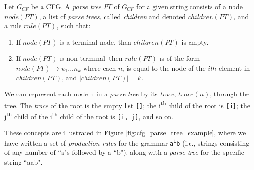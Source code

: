 \begin{definition}
\label{def:parse_tree}
Let $G_{CF}$ be a CFG. A \textit{parse tree} $PT$ of $G_{CF}$ for a given string consists of a node $node(PT)$, a list of \textit{parse trees}, called \textit{children} and denoted $children(PT)$, and a rule $rule(PT)$, such that:
\begin{enumerate}[nolistsep]
\item If $node(PT)$ is a terminal node, then $children(PT)$ is empty.
\item If $node(PT)$ is non-terminal, then $rule(PT)$ is of the form $node(PT) \to n_1 ... n_k$ where each $n_i$ is equal to the node of the $ith$ element in $children(PT)$, and $|children(PT)| = k$.
\end{enumerate}
\end{definition}

\begin{definition}
We can represent each node n in a \textit{parse tree} by its \textit{trace}, $trace(n)$, through the tree. The \textit{trace} of the root is the empty list \texttt{[]}; the i\textsuperscript{th} child of the root is \texttt{[i]}; the j\textsuperscript{th} child of the i\textsuperscript{th} child of the root is \texttt{[i, j]}, and so on.
\end{definition}

\noindent
These concepts are illustrated in Figure \ref{fig:cfg_parse_tree_example}, where we have written a set of \textit{production rules} for the grammar \texttt{a\textsuperscript{i}b} (i.e., strings consisting of any number of ``a"s followed by a ``b"), along with a \textit{parse tree} for the specific string ``aab".

